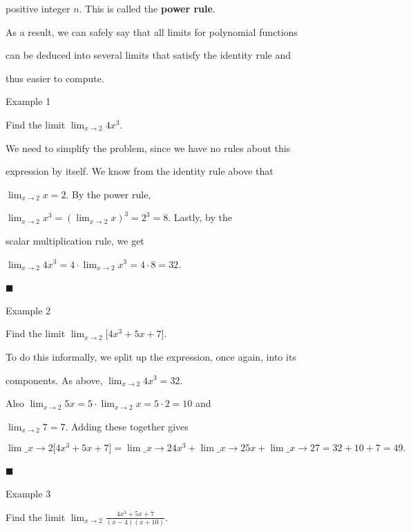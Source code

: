 positive integer $n$. This is called the \textbf{power rule}.



As a result, we can safely say that all limits for polynomial functions

can be deduced into several limits that satisfy the identity rule and

thus easier to compute.



Example 1



Find the limit $\lim_{x\to 2}4x^3$.



We need to simplify the problem, since we have no rules about this

expression by itself. We know from the identity rule above that

$\lim_{x\to2}x=2$. By the power rule,

$\lim_{x\to2}x^3=\left(\lim_{x\to2}x\right)^3=2^3=8$. Lastly, by the

scalar multiplication rule, we get

$\lim_{x\to2}4x^3=4\cdot\lim_{x\to2}x^3=4\cdot 8=32.$



$\blacksquare$



Example 2



Find the limit $\lim_{x\to2}\Big[4x^3+5x+7\Big]$.



To do this informally, we split up the expression, once again, into its

components. As above, $\lim_{x\to2}4x^3=32$.



Also $\lim_{x\to2}5x=5\cdot\lim_{x\to2}x=5\cdot 2=10$ and

$\lim_{x\to2}7=7$. Adding these together gives



$$\lim\_{x\to2}\Big[4x^3+5x+7\Big]=\lim\_{x\to2}4x^3+\lim\_{x\to2}5x+\lim\_{x\to2}7=32+10+7=49.$$



$\blacksquare$



Example 3



Find the limit $\lim_{x\to2}\frac{4x^3+5x+7}{(x-4)(x+10)}$.



